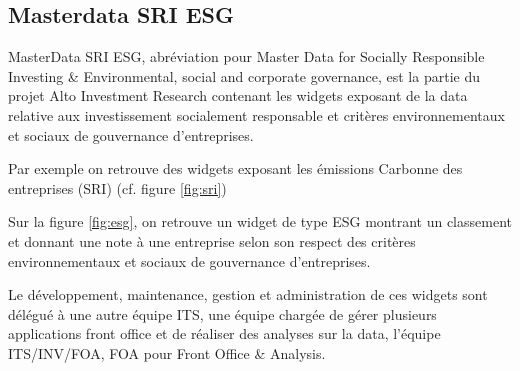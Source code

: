 \subsection{Masterdata SRI ESG}
\par MasterData SRI ESG, abréviation pour Master Data for Socially Responsible Investing \& Environmental, social and corporate governance, est la partie du projet Alto Investment Research contenant les widgets exposant de la data relative aux investissement socialement responsable et critères environnementaux et sociaux de gouvernance d'entreprises.
\par Par exemple on retrouve des widgets exposant les émissions Carbonne des entreprises (SRI) (cf. figure \ref{fig:sri}) 
\par Sur la figure \ref{fig:esg}, on retrouve un widget de type ESG montrant un classement et donnant une note à une entreprise selon son respect des critères environnementaux et sociaux de gouvernance d'entreprises.
\par Le développement, maintenance, gestion et administration de ces widgets sont délégué à une autre équipe ITS, une équipe chargée de gérer plusieurs applications front office et de réaliser des analyses sur la data, l'équipe ITS/INV/FOA, FOA pour Front Office \& Analysis.
